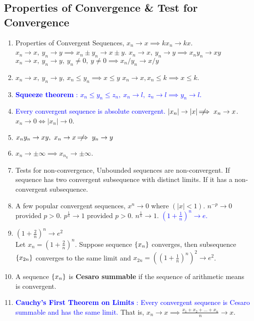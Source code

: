 \subsection{Properties of Convergence \& Test for Convergence}
\begin{enumerate}
	\item Properties of Convergent Sequences,
		\subitem $x_n \to x \implies kx_n \to kx$.
		\subitem $x_n \to x,\ y_n \to y \implies x_n \pm y_n \to x \pm y$.
		\subitem $x_n \to x,\ y_n \to y \implies x_n y_n \to xy$
		\subitem $x_n \to x,\ y_n \to y,\ y_n \ne 0,\ y \ne 0 \implies x_n/y_n \to x/y$ 
	\item $x_n \to x,\ y_n \to y,\ x_n \le y_n \implies x \le y$
		\subitem $x_n \to x, x_n \le k \implies x \le k$.
	\item \textcolor{blue}{\textbf{Squeeze theorem} : $x_n \le y_n \le z_n,\ x_n \to l,\ z_n \to l \implies y_n \to l$.}
	\item \textcolor{blue}{Every convergent sequence is absolute convergent.}
	\subitem $|x_n| \to |x| \;\not\nobreak\!\!\!\!\implies x_n \to x$.
	\subitem $x_n \to 0 \iff |x_n| \to 0$.
	\item $x_ny_n \to xy, \ x_n \to x \;\not\nobreak\!\!\!\!\implies y_n \to y$
	\item $x_n \to \pm \infty \implies x_{n_k} \to \pm \infty$.
	\item Tests for non-convergence,
		\subitem Unbounded sequences are non-convergent.
		\subitem If sequence has two convergent subsequence with distinct limits.
		\subitem If it has a non-convergent subsequence.
	\item A few popular convergent sequences,
		\subitem $x^n \to 0$ where $(|x| < 1)$.
		\subitem $n^{-p} \to 0$ provided $p > 0$.
		\subitem $p^\frac{1}{n} \to 1$ provided $p > 0$.
		\subitem $n^\frac{1}{n} \to 1$.
		\subitem \textcolor{blue}{$(1+\frac{1}{n})^n \to e$.}
	\item $(1+\frac{2}{n})^n \to e^2$\\
		Let $x_n = (1+\frac{2}{n})^n$. Suppose sequence $\{x_n\}$ converges, then subsequence $\{x_{2n}\}$ converges to the same limit and $x_{2n} = \left((1+\frac{1}{n})^n\right)^2 \to e^2$.
	\item A sequence $\{x_n\}$ is \textbf{Cesaro summable} if the sequence of arithmetic means is convergent.
\item \textcolor{blue}{\textbf{Cauchy's First Theorem on Limits} : Every convergent sequence is Cesaro summable and has the same limit.} That is, $x_n \to x \implies \frac{x_1+x_2+\dots+x_n}{n} \to x$.

\end{enumerate}
